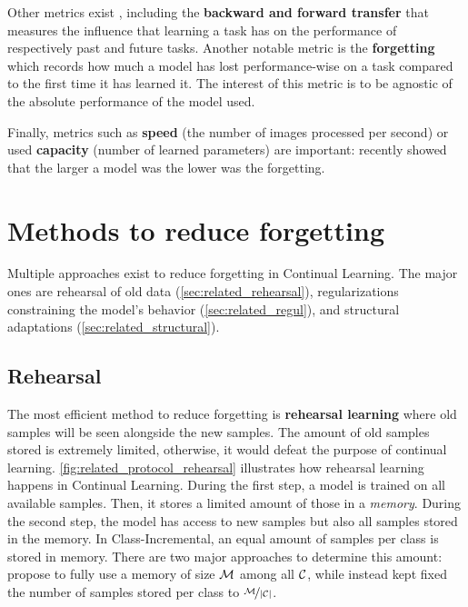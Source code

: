 Other metrics exist \citep{diaz2018continualmetrics}, including the \textbf{backward and
      forward transfer} \citep{lopezpaz2017gem} that measures the influence that learning a task has on
the performance of respectively past and future tasks. Another notable metric is the
\textbf{forgetting} \citep{chaudhry2018riemannien_walk} which records how much a model has lost
performance-wise on a task compared to the first time it has learned it. The interest of this metric
is to be agnostic of the absolute performance of the model used.

Finally, metrics such as \textbf{speed} (\ie the number of images processed per second) or used
\textbf{capacity} (\ie number of learned parameters) are important:
\cite{ramasesh2022scalecontinual} recently showed that the larger a model was the lower was the
forgetting.

\section{Methods to reduce forgetting}
\label{sec:related_methods}

Multiple approaches exist to reduce forgetting in Continual Learning. The major ones are
rehearsal of old data (\autoref{sec:related_rehearsal}), regularizations constraining the model's
behavior (\autoref{sec:related_regul}), and structural adaptations (\autoref{sec:related_structural}).

\subsection{Rehearsal}
\label{sec:related_rehearsal}

The most efficient method to reduce forgetting is \textbf{rehearsal learning} where old samples will
be seen alongside the new samples. The amount of old samples stored is extremely limited, otherwise,
it would defeat the purpose of continual learning. \autoref{fig:related_protocol_rehearsal} illustrates how
rehearsal learning happens in Continual Learning. During the first step, a model is trained on all
available samples. Then, it stores a limited amount of those in a \textit{memory}. During the second
step, the model has access to new samples but also all samples stored in the memory. In
Class-Incremental, an equal amount of samples per class is stored in memory. There are
two major approaches to determine this amount: \cite{rebuffi2017icarl} propose to fully use a
memory of size $\mathcal{M}$ among all $\mathcal{C}$, while \cite{hou2019ucir} instead kept fixed the number of
samples stored per class to $\nicefrac{\mathcal{M}}{|\mathcal{C}|}$.


